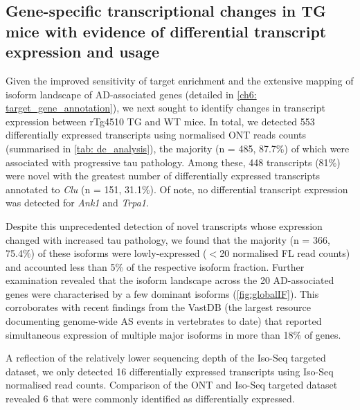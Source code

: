 \newpage
\subsection{Gene-specific transcriptional changes in TG mice with evidence of differential transcript expression and usage}
Given the improved sensitivity of target enrichment and the extensive mapping of isoform landscape of AD-associated genes (detailed in \cref{ch6: target_gene_annotation}), we next sought to identify changes in transcript expression between rTg4510 TG and WT mice. In total, we detected 553 differentially expressed transcripts using normalised ONT reads counts (summarised in \cref{tab: de_analysis}), the majority (n = 485, 87.7\%) of which were associated with progressive tau pathology. Among these, 448 transcripts (81\%) were novel with the greatest number of differentially expressed transcripts annotated to \textit{Clu} (n = 151, 31.1\%). Of note, no differential transcript expression was detected for \textit{Ank1} and \textit{Trpa1}. 

Despite this unprecedented detection of novel transcripts whose expression changed with increased tau pathology, we found that the majority (n = 366, 75.4\%) of these isoforms were lowly-expressed ($<$20 normalised FL read counts) and accounted less than 5\% of the respective isoform fraction. Further examination revealed that the isoform landscape across the 20 AD-associated genes were characterised by a few dominant isoforms (\cref{fig:globalIF}). This corroborates with recent findings from the VastDB\cite{Tapial2017} (the largest resource documenting genome-wide AS events in vertebrates to date) that reported simultaneous expression of multiple major isoforms in more than 18\% of genes\cite{Tapial2017}. 

A reflection of the relatively lower sequencing depth of the Iso-Seq targeted dataset, we only detected 16 differentially expressed transcripts using Iso-Seq normalised read counts. Comparison of the ONT and Iso-Seq targeted dataset revealed 6 that were commonly identified as differentially expressed. 

